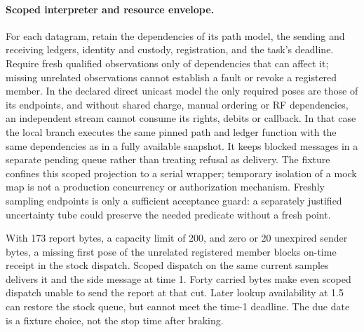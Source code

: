 \documentclass[11pt]{article}
\begin{document}
\paragraph{Scoped interpreter and resource envelope.}
For each datagram, retain the dependencies of its path model, the
sending and receiving ledgers, identity and custody, registration,
and the task's deadline. Require fresh qualified observations only
of dependencies that can affect it; missing unrelated observations
cannot establish a fault or revoke a registered member. In the
declared direct unicast model the only required poses are those of
its endpoints, and without shared charge, manual ordering or RF
dependencies, an independent stream cannot consume its rights,
debits or callback. In that case the local branch executes the
same pinned path and ledger function with the same dependencies
as in a fully available snapshot. It keeps blocked messages in a
separate pending queue rather than treating refusal as delivery.
The fixture confines this scoped projection to a serial wrapper;
temporary isolation of a mock map is not a production concurrency
or authorization mechanism. Freshly sampling endpoints is only a
sufficient acceptance guard: a separately justified uncertainty
tube could preserve the needed predicate without a fresh point.

With 173 report bytes, a capacity limit of 200, and zero or 20
unexpired sender bytes, a missing first pose of the unrelated
registered member blocks on-time receipt in the stock dispatch.
Scoped dispatch on the same current samples delivers it and the
side message at time 1. Forty carried bytes make even scoped
dispatch unable to send the report at that cut. Later lookup
availability at 1.5 can restore the stock queue, but cannot meet
the time-1 deadline. The due date is a fixture choice, not the
stop time after braking.
\end{document}
